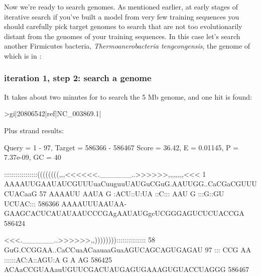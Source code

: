 Now we're ready to search genomes. As mentioned earlier, at early
stages of iterative search if you've built a model from very few
training sequences you should carefully pick target genomes to search that are
not too evolutionarily distant from the genomes of your training
sequences. In this case let's search another Firmicutes bacteria,
\emph{Thermoanerobacteria tengcongensis}, the genome of which is in \newline
{}:

\subsubsection{iteration 1, step 2: search a genome}

It takes about two minutes for  to search the 5 Mb
genome, and one hit is found:

{\samepage
\begin{sreoutput}
>gi|20806542|ref|NC_003869.1|

  Plus strand results:

 Query = 1 - 97, Target = 586366 - 586467
 Score = 36.42, E = 0.01145, P = 7.37e-09, GC =  40

           :::::::::::::::::((((((((,,,<<<<<<.______..>>>>>>,,,,,,,,<<<
         1 AAAAUUGAAUAUCGUUUuaCuuguuUAUGuCGuG.AAUUGG..CaCGaCGUUUCUACaaG 57      
           AAAAUU AAUA  G   :ACU::U:UA ::C::: AAU  G  :::G::GU UCUAC:::
    586366 AAAAUUUAAUAA-GAAGCACUCAUAUAAUCCCGAgAAUAUGgcUCGGGAGUCUCUACCGA 586424  

           <<<.______..>>>>>>,,)))))))):::::::::::::::
        58 GuG.CCGGAA..CaCCuaACaauaaGuaAGUCAGCAGUGAGAU 97      
           ::: CCG AA  ::::::AC:A::AGU:A    G A   AG  
    586425 ACAaCCGUAAauUGUUCGACUAUGAGUGAAAGUGUACCUAGGG 586467  
\end{sreoutput}
}

